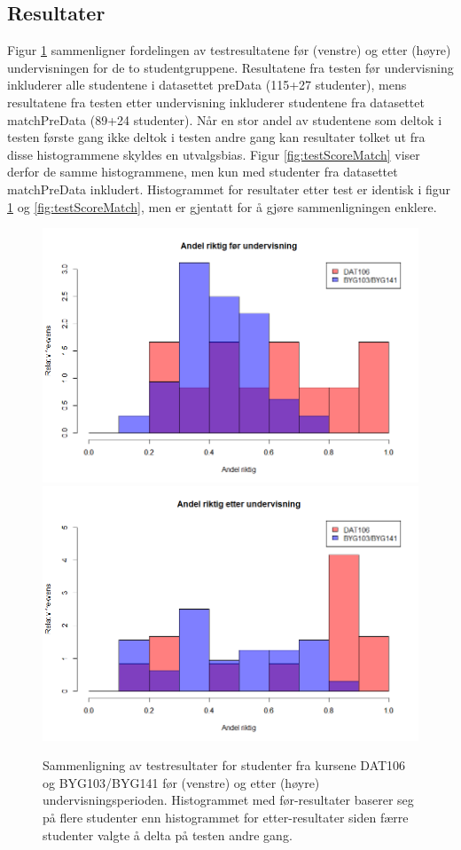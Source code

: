 \documentclass[a4paper,norsk,12pt]{article}
\begin{document}
\subsection{Resultater}
Figur \ref{fig:testScore} sammenligner fordelingen av testresultatene før (venstre) og etter (høyre) undervisningen for de to studentgruppene. Resultatene fra testen før undervisning inkluderer alle studentene i datasettet preData (115+27 studenter), mens resultatene fra testen etter undervisning inkluderer studentene fra datasettet matchPreData (89+24 studenter). Når en stor andel av studentene som deltok i testen første gang ikke deltok i testen andre gang kan resultater tolket ut fra disse histogrammene skyldes en utvalgsbias. Figur \ref{fig:testScoreMatch} viser derfor de samme histogrammene, men kun med studenter fra datasettet matchPreData inkludert. Histogrammet for resultater etter test er identisk i figur \ref{fig:testScore} og \ref{fig:testScoreMatch}, men er gjentatt for å gjøre sammenligningen enklere.
\begin{figure}[p]
	\includegraphics[width=.48\textwidth]{./preScoreAll}
	\includegraphics[width=.48\textwidth]{./postScore}
	\caption{Sammenligning av testresultater for studenter fra kursene DAT106 og  BYG103/BYG141 før (venstre) og etter (høyre) undervisningsperioden. Histogrammet med før-resultater 
baserer seg på flere studenter enn histogrammet for etter-resultater siden færre studenter valgte å delta på testen andre gang.}
	\label{fig:testScore}
\end{figure}
\end{document}
